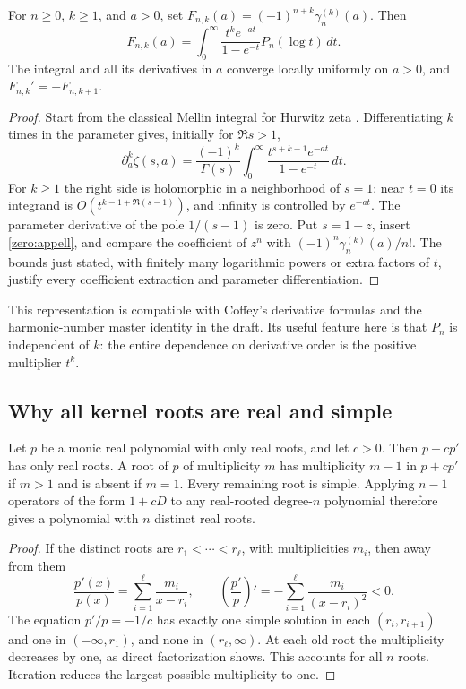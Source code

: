\begin{theorem}\label{zero:kernel}
For $n\geq0$, $k\geq1$, and $a>0$, set
$F_{n,k}(a)=(-1)^{n+k}\gamma_n^{(k)}(a)$.  Then
\begin{equation}\label{zero:laplace}
 F_{n,k}(a)=\int_0^\infty
       \frac{t^k e^{-at}}{1-e^{-t}}P_n(\log t)\,dt.
\end{equation}
The integral and all its derivatives in $a$ converge locally uniformly
on $a>0$, and $F_{n,k}'=-F_{n,k+1}$.
\end{theorem}
\begin{proof}
Start from the classical Mellin integral for Hurwitz zeta
\cite{DLMF25}.  Differentiating $k$ times in the parameter gives, initially
for $\Re s>1$,
\[
 \partial_a^k\zeta(s,a)
   =\frac{(-1)^k}{\Gamma(s)}
      \int_0^\infty\frac{t^{s+k-1}e^{-at}}{1-e^{-t}}\,dt.
\]
For $k\geq1$ the right side is holomorphic in a neighborhood of $s=1$:
near $t=0$ its integrand is $O(t^{k-1+\Re(s-1)})$, and infinity is
controlled by $e^{-at}$.  The parameter derivative of the pole
$1/(s-1)$ is zero.  Put $s=1+z$, insert \eqref{zero:appell}, and
compare the coefficient of $z^n$ with
$(-1)^n\gamma_n^{(k)}(a)/n!$.  The bounds just stated, with finitely
many logarithmic powers or extra factors of $t$, justify every
coefficient extraction and parameter differentiation.
\end{proof}

This representation is compatible with Coffey's derivative formulas
\cite{Coffey2009} and the harmonic-number master identity in the draft.
Its useful feature here is that $P_n$ is independent of $k$: the entire
dependence on derivative order is the positive multiplier $t^k$.

\subsection{Why all kernel roots are real and simple}

\begin{lemma}\label{zero:root-preserver}
Let $p$ be a monic real polynomial with only real roots, and let $c>0$.
Then $p+cp'$ has only real roots.  A root of $p$ of multiplicity $m$
has multiplicity $m-1$ in $p+cp'$ if $m>1$ and is absent if $m=1$.
Every remaining root is simple.  Applying $n-1$ operators of the form
$1+cD$ to any real-rooted degree-$n$ polynomial therefore gives a
polynomial with $n$ distinct real roots.
\end{lemma}
\begin{proof}
If the distinct roots are $r_1<\cdots<r_\ell$, with multiplicities
$m_i$, then away from them
\[
 \frac{p'(x)}{p(x)}=\sum_{i=1}^{\ell}\frac{m_i}{x-r_i},
 \qquad
 \left(\frac{p'}p\right)'=-\sum_{i=1}^{\ell}
                                  \frac{m_i}{(x-r_i)^2}<0.
\]
The equation $p'/p=-1/c$ has exactly one simple solution in each
$(r_i,r_{i+1})$ and one in $(-\infty,r_1)$, and none in
$(r_\ell,\infty)$.  At each old root the multiplicity decreases
by one, as direct factorization shows.  This accounts for all $n$
roots.  Iteration reduces the largest possible multiplicity to one.
\end{proof}

